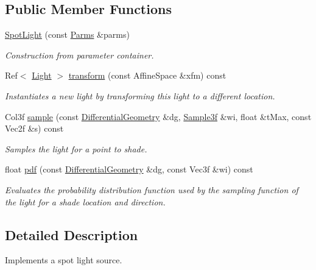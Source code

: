 \subsection*{Public Member Functions}
\begin{DoxyCompactItemize}
\item 
\hyperlink{classembree_1_1_spot_light_a84873c7a565d2a9da1223508541a223c}{SpotLight} (const \hyperlink{classembree_1_1_parms}{Parms} \&parms)
\begin{DoxyCompactList}\small\item\em Construction from parameter container. \item\end{DoxyCompactList}\item 
Ref$<$ \hyperlink{classembree_1_1_light}{Light} $>$ \hyperlink{classembree_1_1_spot_light_a52ad1d555a37fbd62c4f8233d69bed74}{transform} (const AffineSpace \&xfm) const 
\begin{DoxyCompactList}\small\item\em Instantiates a new light by transforming this light to a different location. \item\end{DoxyCompactList}\item 
Col3f \hyperlink{classembree_1_1_spot_light_a322a13a8d47115593bbd244baff4e398}{sample} (const \hyperlink{structembree_1_1_differential_geometry}{DifferentialGeometry} \&dg, \hyperlink{structembree_1_1_sample}{Sample3f} \&wi, float \&tMax, const Vec2f \&s) const 
\begin{DoxyCompactList}\small\item\em Samples the light for a point to shade. \item\end{DoxyCompactList}\item 
float \hyperlink{classembree_1_1_spot_light_a80916ed69cf920d7fee8274eacb5f0d3}{pdf} (const \hyperlink{structembree_1_1_differential_geometry}{DifferentialGeometry} \&dg, const Vec3f \&wi) const 
\begin{DoxyCompactList}\small\item\em Evaluates the probability distribution function used by the sampling function of the light for a shade location and direction. \item\end{DoxyCompactList}\end{DoxyCompactItemize}


\subsection{Detailed Description}
Implements a spot light source. 

